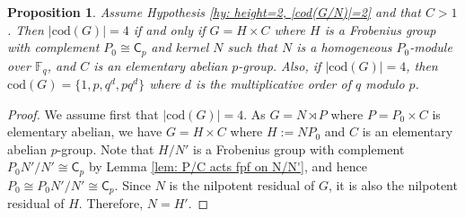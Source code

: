\documentclass[9pt]{article}
\newtheorem{prop}[lem]{\bf Proposition}
\begin{document}
\begin{prop}\label{prop: height=2, |cod(G/N)|=2, C>1}
   Assume Hypothesis \ref{hy: height=2, |cod(G/N)|=2} and that $C>1$. 
   Then $|\mathrm{cod}(G)|=4$ if and only if 
    $G=H\times C$ 
	where $H$ is a Frobenius group with complement $P_0\cong \mathsf{C}_{p}$ and kernel $N$
	such that $N$ is a homogeneous $P_0$-module over $\mathbb{F}_q$,
	and $C$ is an elementary abelian $p$-group.
	Also, if $|\mathrm{cod}(G)|=4$, then $\mathrm{cod}(G)=\{ 1,p,q^{d},pq^{d} \}$ where 
	$d$ is the multiplicative order of $q$ modulo $p$.
\end{prop}
\begin{proof}
    We assume first that $|\mathrm{cod}(G)|=4$.
	As $G=N \rtimes P$ where $P=P_0\times C$ is elementary abelian,
	we have $G=H\times C$ where $H:=NP_0$ and $C$ is an elementary abelian $p$-group.
    Note that $H/N'$ is a Frobenius group with complement $P_0N'/N'\cong \mathsf{C}_{p}$ by Lemma \ref{lem: P/C acts fpf on N/N'},
	and hence $P_0\cong P_0N'/N'\cong \mathsf{C}_{p}$.
	Since $N$ is the nilpotent residual of $G$,
	it is also the nilpotent residual of $H$.
	Therefore, $N=H'$.





\end{proof}
\end{document}
